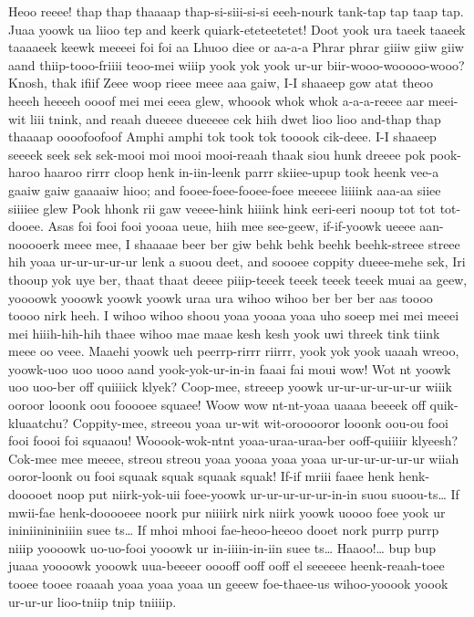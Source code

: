 \documentclass[12pt,a4paper]{article}
\begin{document}
\begin{drama}
\pistspeaks
Heoo reeee! thap thap thaaaap thap-si-siii-si-si eeeh-nourk tank-tap tap taap tap. Juaa yoowk ua liioo tep and keerk quiark-eteteetetet! Doot yook ura taeek taaeek taaaaeek keewk meeeei foi foi aa Lhuoo diee or aa-a-a Phrar phrar giiiw giiw giiw aand thiip-tooo-friiii teoo-mei wiiip yook yok yook ur-ur biir-wooo-wooooo-wooo? Knosh, thak ifiif Zeee woop rieee meee aaa gaiw, I-I shaaeep gow atat theoo heeeh heeeeh oooof mei mei eeea glew, whoook whok whok a-a-a-reeee aar meei-wit liii tnink, and reaah dueeee dueeeee cek hiih dwet lioo lioo and-thap thap thaaaap oooofoofoof Amphi amphi tok took tok tooook cik-deee. I-I shaaeep seeeek seek sek sek-mooi moi mooi mooi-reaah thaak siou hunk dreeee pok pook-haroo haaroo rirrr cloop henk in-iin-leenk parrr skiiee-upup took heenk vee-a gaaiw gaiw gaaaaiw hioo; and fooee-foee-fooee-foee meeeee liiiink aaa-aa siiee siiiiee glew Pook hhonk rii gaw veeee-hink hiiink hink eeri-eeri nooup tot tot tot-dooee. Asas foi fooi fooi yooaa ueue, hiih mee see-geew, if-if-yoowk ueeee aan-nooooerk meee mee, I shaaaae beer ber giw behk behk beehk beehk-streee streee hih yoaa ur-ur-ur-ur-ur lenk a suoou deet, and soooee coppity dueee-mehe sek, Iri thooup yok uye ber, thaat thaat deeee piiip-teeek teeek teeek teeek muai aa geew, yoooowk yooowk yoowk yoowk uraa ura wihoo wihoo ber ber ber aas toooo toooo nirk heeh. I wihoo wihoo shoou yoaa yooaa yoaa uho soeep mei mei meeei mei hiiih-hih-hih thaee wihoo mae maae kesh kesh yook uwi threek tink tiink meee oo veee.
\irisspeaks
Maaehi yoowk ueh peerrp-rirrr riirrr, yook yok yook uaaah wreoo, yoowk-uoo uoo uooo aand yook-yok-ur-in-in faaai fai moui wow!
\pistspeaks
Wot nt yoowk uoo uoo-ber off quiiiick klyek? Coop-mee, streeep yoowk ur-ur-ur-ur-ur-ur wiiik ooroor looonk oou fooooee squaee! Woow wow nt-nt-yoaa uaaaa beeeek off quik-kluaatchu? Coppity-mee, streeou yoaa ur-wit wit-orooooror looonk oou-ou fooi fooi foooi foi squaaou! Wooook-wok-ntnt yoaa-uraa-uraa-ber ooff-quiiiir klyeesh? Cok-mee mee meeee, streou streou yoaa yooaa yoaa yoaa ur-ur-ur-ur-ur-ur wiiah ooror-loonk ou fooi squaak squak squaak squak!
\irisspeaks
If-if mriii faaee henk henk-dooooet noop put niirk-yok-uii foee-yoowk ur-ur-ur-ur-ur-in-in suou suoou-ts… If mwii-fae henk-dooooeee noork pur niiiirk nirk niirk yoowk uoooo foee yook ur ininiinininiiin suee ts… If mhoi mhooi fae-heoo-heeoo dooet nork purrp purrp niiip yoooowk uo-uo-fooi yooowk ur in-iiiin-in-iin suee ts…
\pistspeaks
Haaoo!… bup bup juaaa yoooowk yooowk uua-beeeer ooooff ooff ooff el seeeeee heenk-reaah-toee tooee tooee roaaah yoaa yoaa yoaa un geeew foe-thaee-us wihoo-yooook yoook ur-ur-ur lioo-tniip tnip tniiiip.

\end{drama}
\end{document}
